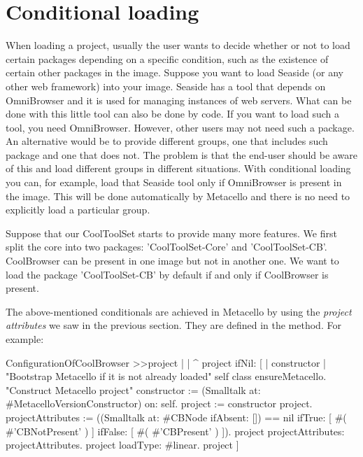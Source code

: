 \documentclass[a4paper,10pt,twoside]{book}
\begin{document}
\begin{code}{}
\begin{code}{}
\begin{code}{}
\end{code}


\section{Conditional loading}
When loading a project, usually the user wants to decide whether or not to load certain packages depending on a specific condition, such as the existence of certain other packages in the image. Suppose you want to load Seaside (or any other web framework) into your image. Seaside has a tool that depends on OmniBrowser and it is used for managing instances of web servers. What can be done with this little tool can also be done by code. If you want to load such a tool, you need OmniBrowser. However, other users may not need such a package. An alternative would be to provide different groups, one that includes such package and one that does not. The problem is that the end-user should be aware of this and load different groups in different situations.  With conditional loading you can, for example, load that Seaside tool only if OmniBrowser is present in the image. This will be done automatically by Metacello and there is no need to explicitly load a particular group. 

Suppose that our CoolToolSet starts to provide many more features. We first split the core into two packages: 'CoolToolSet-Core' and 'CoolToolSet-CB'. CoolBrowser can be present in one image but not in another one. We want to load the package 'CoolToolSet-CB' by default  if and only if CoolBrowser is present. 

The above-mentioned conditionals are achieved in Metacello by using the \emph{project attributes} we saw in the previous section. They are defined in the  method. 
For example:


\begin{code}{}
ConfigurationOfCoolBrowser >>project
	|  | 
	^ project ifNil: [ | constructor |
		"Bootstrap Metacello if it is not already loaded"
		self class ensureMetacello.
		"Construct Metacello project"
		constructor := (Smalltalk at: #MetacelloVersionConstructor) on: self.
		project := constructor project.
		projectAttributes :=  ((Smalltalk at: #CBNode ifAbsent: []) == nil
			ifTrue: [ #( #'CBNotPresent' ) ]
			ifFalse: [ #( #'CBPresent' ) ]).
		project projectAttributes:  projectAttributes.
		project loadType: #linear.
		project ]

\end{code}


\end{code}
\end{code}
\end{document}
